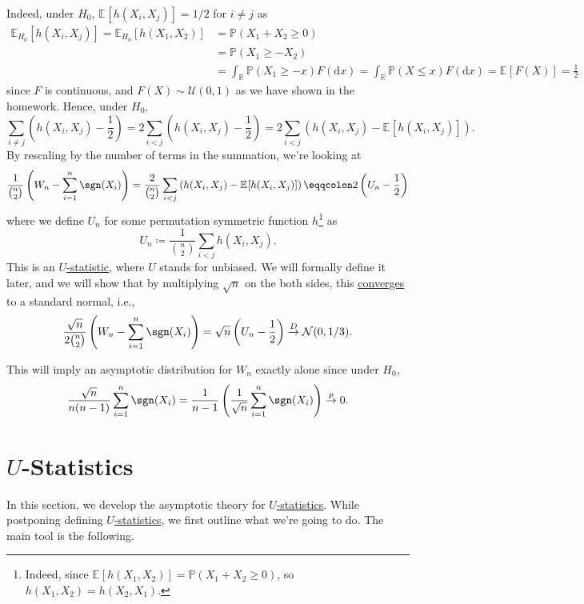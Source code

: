 Indeed, under \(H_0\), \(\mathbb{E}_{}[h(X_i, X_j)] = 1 / 2\) for \(i \neq j\) as
\[
	\begin{split}
		\mathbb{E}_{H_0}[h(X_i, X_j)]
		= \mathbb{E}_{H_0}[h(X_1, X_2)]
		 & = \mathbb{P} (X_1 + X_2 \geq 0)                             \\
		 & = \mathbb{P} (X_1 \geq -X_2)                                \\
		 & = \int _\mathbb{R} \mathbb{P} (X_1 \geq -x) F(\mathrm{d} x)
		= \int _\mathbb{R} \mathbb{P} (X \leq x) F(\mathrm{d} x)
		= \mathbb{E}_{}[F(X)]
		= \frac{1}{2}
	\end{split}
\]
since \(F\) is continuous, and \(F(X) \sim \mathcal{U} (0, 1)\) as we have shown in the homework. Hence, under \(H_0\),
\[
	\sum_{i \neq j} \left( h(X_i, X_j) - \frac{1}{2} \right)
	= 2 \sum_{i < j} \left( h(X_i, X_j) - \frac{1}{2} \right)
	= 2 \sum_{i < j} \left( h(X_i, X_j) - \mathbb{E}_{}[h(X_i, X_j)] \right).
\]
By rescaling by the number of terms in the summation, we're looking at
\[
	\frac{1}{\binom{n}{2}} \left( W_n - \sum_{i=1}^{n} \sgn (X_i) \right)
	= \frac{2}{\binom{n}{2}} \sum_{i < j} \left( h(X_i, X_j) - \mathbb{E}_{}[h(X_i, X_j)] \right)
	\eqqcolon 2 \left( U_n - \frac{1}{2} \right)
\]
where we define \(U_n\) for some permutation symmetric function \(h\)\footnote{Indeed, since \(\mathbb{E}_{}[h(X_1, X_2)] = \mathbb{P} (X_1 + X_2 \geq 0)\), so \(h(X_1, X_2) = h(X_2, X_1)\).} as
\[
	U_n \coloneqq \frac{1}{\binom{n}{2}} \sum_{i < j} h(X_i, X_j).
\]
This is an \hyperref[def:U-statistic]{\(U\)-statistic}, where \(U\) stands for unbiased. We will formally define it later, and we will show that by multiplying \(\sqrt{n} \) on the both sides, this \hyperref[def:converge-in-distribution]{converges} to a standard normal, i.e.,
\begin{equation}\label{eq:Wilcoxon-signed-rank-test}
	\frac{\sqrt{n}}{2 \binom{n}{2}}  \left( W_n - \sum_{i=1}^{n} \sgn (X_i) \right)
	= \sqrt{n} \left( U_n - \frac{1}{2} \right)
	\overset{D}{\to} \mathcal{N} (0, 1 / 3).
\end{equation}

\begin{note}\label{not:Wilcoxon-signed-rank-test-alone}
	This will imply an asymptotic distribution for \(W_n\) exactly alone since under \(H_0\),
	\[
		\frac{\sqrt{n} }{n(n-1)} \sum_{i=1}^{n} \sgn (X_i)
		= \frac{1}{n-1} \left( \frac{1}{\sqrt{n} } \sum_{i=1}^{n} \sgn (X_i) \right)
		\overset{p}{\to} 0.
	\]
\end{note}

\section{\(U\)-Statistics}
In this section, we develop the asymptotic theory for \hyperref[def:U-statistic]{\(U\)-statistics}. While postponing defining \hyperref[def:U-statistic]{\(U\)-statistics}, we first outline what we're going to do. The main tool is the following.

